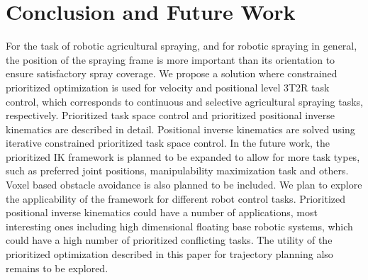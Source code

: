 \section{Conclusion and Future Work}
For the task of robotic agricultural spraying, and for robotic spraying in general, the position of the spraying frame is more important than its orientation to ensure satisfactory spray coverage. We propose a solution where constrained prioritized optimization is used for velocity and positional level 3T2R task control, which corresponds to continuous and selective agricultural spraying tasks, respectively. Prioritized task space control and prioritized positional inverse kinematics are described in detail. Positional inverse kinematics are solved using iterative constrained prioritized task space control. In the future work, the prioritized IK framework is planned to be expanded to allow for more task types, such as preferred joint positions, manipulability maximization task and others. Voxel based obstacle avoidance is also planned to be included. We plan to explore the applicability of the framework for different robot control tasks. Prioritized positional inverse kinematics could have a number of applications, most interesting ones including high dimensional floating base robotic systems, which could have a high number of prioritized conflicting tasks. The utility of the prioritized optimization described in this paper for trajectory planning also remains to be explored.    
